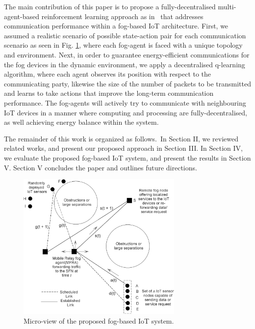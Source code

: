 \documentclass[journal]{IEEEtran}
\begin{document}
The main contribution of this paper is to propose a fully-decentralised multi-agent-based reinforcement learning approach as in~\cite{Gueriau2018} that addresses communication performance within a fog-based IoT architecture. First, we assumed a realistic scenario of possible state-action pair for each communication scenario as seen in  Fig. \ref{ideafig1}, where each fog-agent is faced with a unique topology and environment. Next, in order to guarantee energy-efficient communications for the fog devices in the dynamic environment, we apply a decentralised q-learning algorithm, where each agent observes its position with respect to the communicating party, likewise the size of the number of packets to be transmitted and learns to take actions that improve the long-term communication performance. The fog-agents will actively try to communicate with neighbouring IoT devices in a manner where computing and processing are fully-decentralised, as well achieving energy balance within the system.

The remainder of this work is organized as follows.~In Section II, we reviewed related works, and present our proposed approach in Section III. In Section IV, we evaluate the proposed fog-based IoT system, and present the results in Section V. Section V concludes the paper and outlines future directions.





\begin{figure}[!t]
\centering
\includegraphics[width=3.2in]{ideafig1.eps}
\caption{Micro-view of the proposed fog-based IoT system.}
\label{ideafig1}
\end{figure}
\end{document}
